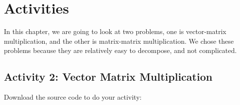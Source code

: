 \documentclass[letterpaper,10pt,openany,oneside]{sphinxmanual}
\begin{document}
\chapter{Activities}
\label{Activities/Activities:activities}\label{Activities/Activities::doc}
In this chapter, we are going to look at two problems, one is vector-matrix multiplication, and the other is matrix-matrix multiplication. We chose these problems because they are relatively easy to decompose, and not complicated.


\section{Activity 2: Vector Matrix Multiplication}
\label{Activities/Activities:activity-2-vector-matrix-multiplication}
Download the source code to do your activity:
\begin{quote}


\end{quote}
\end{document}
